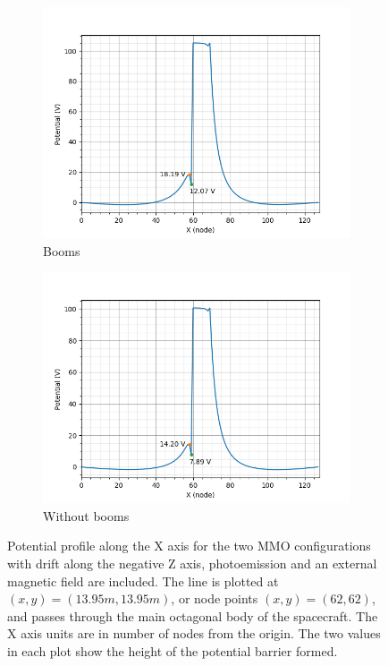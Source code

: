 
\begin{figure}[H]
  \begin{subfigure}[b]{0.6\textwidth}
  \includegraphics[width=\textwidth]{figures/MMO/BField/WB/L_BField_WB.png}
  \caption{Booms}
  \label{fig:L_BField_WB}
\end{subfigure}
\begin{subfigure}[b]{0.6\textwidth}
  \includegraphics[width=\textwidth]{figures/MMO/BField/NB/L_BField_NB.png}
  \caption{Without booms}
  \label{fig:L_BField_NB}
\end{subfigure}
\label{fig:Line_BField}
\caption{Potential profile along the X axis for the two MMO configurations with drift along the negative Z axis, photoemission and an external magnetic field are included. The line is plotted at $(x,y) = (13.95 m, 13.95 m)$, or node points $(x,y) = (62,62)$, and passes through the main octagonal body of the spacecraft. The X axis units are in number of nodes from the origin. The two values in each plot show the height of the potential barrier formed.}
\end{figure}

